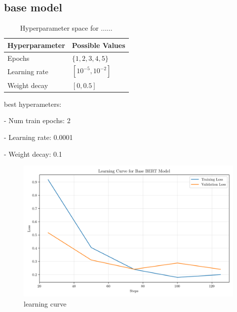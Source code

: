 \documentclass[conference]{IEEEtran}
\begin{document}
\subsection{base model}

\begin{table}[H]
\centering
\caption{Hyperparameter space for ......}
\label{parameters_basebert}
\begin{tabular}{ll}
\toprule
\textbf{Hyperparameter} & \textbf{Possible Values} \\
\midrule
Epochs & $\{1,2,3,4,5\}$ \\
Learning rate & $[10^{-5}, 10^{-2}]$ \\
Weight decay & $[0, 0.5]$ \\
\bottomrule
\end{tabular}
\end{table}

best hyperameters: 

- Num train epochs: 2

- Learning rate: 0.0001

- Weight decay: 0.1

\begin{figure}[H]
    \centering
    \includegraphics[width=1\linewidth]{assets/base_bert_learning_curve.png}
    \caption{learning curve}
    \label{fig:base_bert_learning_curve}
\end{figure}
\end{document}
